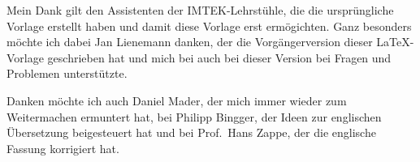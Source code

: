 \acknowledgment
Mein Dank gilt den Assistenten der IMTEK-Lehrst\"uhle, die die urspr\"ungliche
Vorlage erstellt haben und damit diese Vorlage erst erm\"ogichten. Ganz besonders
m\"ochte ich dabei Jan Lienemann danken, der die Vorg\"angerversion dieser
\LaTeX-Vorlage geschrieben hat und mich bei auch bei dieser Version bei Fragen
und Problemen unterst\"utzte.

Danken m\"ochte ich auch Daniel Mader, der mich immer wieder zum
Weitermachen ermuntert hat, bei Philipp Bingger, der Ideen zur englischen
\"Ubersetzung beigesteuert hat und bei Prof.\ Hans Zappe, der die englische
Fassung korrigiert hat. 
